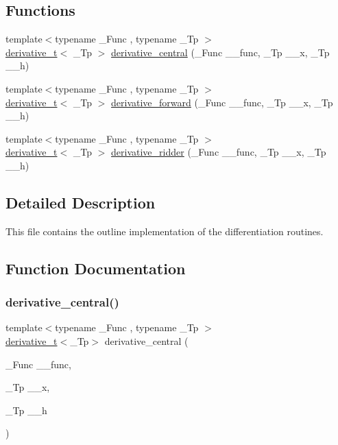 \subsection*{Functions}
\begin{DoxyCompactItemize}
\item 
{\footnotesize template$<$typename \+\_\+\+Func , typename \+\_\+\+Tp $>$ }\\\hyperlink{structderivative__t}{derivative\+\_\+t}$<$ \+\_\+\+Tp $>$ \hyperlink{differentiation_8tcc_aef32000eba6743a6066fdd345ab72f17}{derivative\+\_\+central} (\+\_\+\+Func \+\_\+\+\_\+func, \+\_\+\+Tp \+\_\+\+\_\+x, \+\_\+\+Tp \+\_\+\+\_\+h)
\item 
{\footnotesize template$<$typename \+\_\+\+Func , typename \+\_\+\+Tp $>$ }\\\hyperlink{structderivative__t}{derivative\+\_\+t}$<$ \+\_\+\+Tp $>$ \hyperlink{differentiation_8tcc_ac1cc760446a1455c0e97fe098dde2bc7}{derivative\+\_\+forward} (\+\_\+\+Func \+\_\+\+\_\+func, \+\_\+\+Tp \+\_\+\+\_\+x, \+\_\+\+Tp \+\_\+\+\_\+h)
\item 
{\footnotesize template$<$typename \+\_\+\+Func , typename \+\_\+\+Tp $>$ }\\\hyperlink{structderivative__t}{derivative\+\_\+t}$<$ \+\_\+\+Tp $>$ \hyperlink{differentiation_8tcc_a3e9da1abac5e2d4a10e0eeca1812590d}{derivative\+\_\+ridder} (\+\_\+\+Func \+\_\+\+\_\+func, \+\_\+\+Tp \+\_\+\+\_\+x, \+\_\+\+Tp \+\_\+\+\_\+h)
\end{DoxyCompactItemize}


\subsection{Detailed Description}
This file contains the outline implementation of the differentiation routines. 

\subsection{Function Documentation}
\mbox{\label{differentiation_8tcc_aef32000eba6743a6066fdd345ab72f17}} 
\subsubsection{\texorpdfstring{derivative\+\_\+central()}{derivative\_central()}}
{\footnotesize\ttfamily template$<$typename \+\_\+\+Func , typename \+\_\+\+Tp $>$ \\
\hyperlink{structderivative__t}{derivative\+\_\+t}$<$\+\_\+\+Tp$>$ derivative\+\_\+central (\begin{DoxyParamCaption}\item[{\+\_\+\+Func}]{\+\_\+\+\_\+func,  }\item[{\+\_\+\+Tp}]{\+\_\+\+\_\+x,  }\item[{\+\_\+\+Tp}]{\+\_\+\+\_\+h }\end{DoxyParamCaption})}

